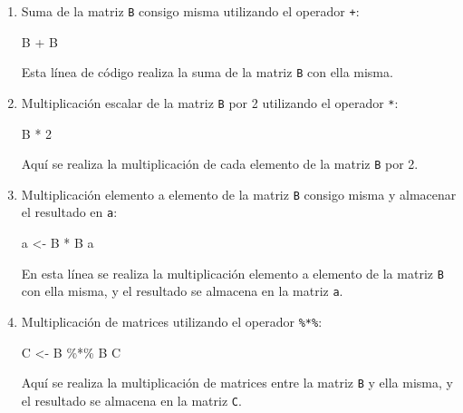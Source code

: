 \documentclass[
  jou,
  floatsintext,
  longtable,
  a4paper,
  nolmodern,
  notxfonts,
  notimes,
  colorlinks=true,linkcolor=blue,citecolor=blue,urlcolor=blue]{apa7}
\newenvironment{Shaded}{\begin{snugshade}}{\end{snugshade}}
\newcommand{\DecValTok}[1]{\textcolor[rgb]{0.68,0.00,0.00}{#1}}
\newcommand{\NormalTok}[1]{\textcolor[rgb]{0.00,0.23,0.31}{#1}}
\newcommand{\OtherTok}[1]{\textcolor[rgb]{0.00,0.23,0.31}{#1}}
\newcommand{\SpecialCharTok}[1]{\textcolor[rgb]{0.37,0.37,0.37}{#1}}
\begin{document}
\begin{enumerate}
\def\labelenumi{\arabic{enumi}.}
\item
  Suma de la matriz \texttt{B} consigo misma utilizando el operador
  \texttt{+}:

\begin{Shaded}
\begin{Highlighting}[]
\NormalTok{B }\SpecialCharTok{+}\NormalTok{ B}
\end{Highlighting}
\end{Shaded}

  Esta línea de código realiza la suma de la matriz \texttt{B} con ella
  misma.
\item
  Multiplicación escalar de la matriz \texttt{B} por 2 utilizando el
  operador \texttt{*}:

\begin{Shaded}
\begin{Highlighting}[]
\NormalTok{B }\SpecialCharTok{*} \DecValTok{2}
\end{Highlighting}
\end{Shaded}

  Aquí se realiza la multiplicación de cada elemento de la matriz
  \texttt{B} por 2.
\item
  Multiplicación elemento a elemento de la matriz \texttt{B} consigo
  misma y almacenar el resultado en \texttt{a}:

\begin{Shaded}
\begin{Highlighting}[]
\NormalTok{a }\OtherTok{\textless{}{-}}\NormalTok{ B }\SpecialCharTok{*}\NormalTok{ B}
\NormalTok{a}
\end{Highlighting}
\end{Shaded}

  En esta línea se realiza la multiplicación elemento a elemento de la
  matriz \texttt{B} con ella misma, y el resultado se almacena en la
  matriz \texttt{a}.
\item
  Multiplicación de matrices utilizando el operador \texttt{\%*\%}:

\begin{Shaded}
\begin{Highlighting}[]
\NormalTok{C }\OtherTok{\textless{}{-}}\NormalTok{ B }\SpecialCharTok{\%*\%}\NormalTok{ B}
\NormalTok{C}
\end{Highlighting}
\end{Shaded}

  Aquí se realiza la multiplicación de matrices entre la matriz
  \texttt{B} y ella misma, y el resultado se almacena en la matriz
  \texttt{C}.
\end{enumerate}
\end{document}
